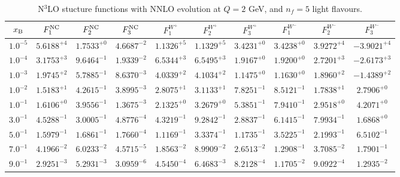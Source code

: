 \begin{table}[h]
\begin{adjustbox}{width=\textwidth}
\begin{tabular}{|c||c|c|c|c|c|c|c|c|c|}
\hline
$x_{\rm B}$ & $F_1^{\rm NC}$ & $F_2^{\rm NC}$ & $F_3^{\rm NC}$ & $F_1^{W^+}$ & $F_2^{W^+}$ & $F_3^{W^+}$ & $F_1^{W^-}$ & $F_2^{W^-}$ & $F_3^{W^-}$ \\
\hline
$ 1.0^{-5}$ & $ 5.6188^{+4}$ & $ 1.7533^{+0}$ & $ 4.6687^{-2}$ & $ 1.1326^{+5}$ & $ 1.1329^{+5}$ & $ 3.4231^{+0}$ & $ 3.4238^{+0}$ & $ 3.9272^{+4}$ & $-3.9021^{+4}$ \\
$ 1.0^{-4}$ & $ 3.1753^{+3}$ & $ 9.6464^{-1}$ & $ 1.9339^{-2}$ & $ 6.5344^{+3}$ & $ 6.5495^{+3}$ & $ 1.9167^{+0}$ & $ 1.9200^{+0}$ & $ 2.7201^{+3}$ & $-2.6173^{+3}$ \\
$ 1.0^{-3}$ & $ 1.9745^{+2}$ & $ 5.7885^{-1}$ & $ 8.6370^{-3}$ & $ 4.0339^{+2}$ & $ 4.1034^{+2}$ & $ 1.1475^{+0}$ & $ 1.1630^{+0}$ & $ 1.8960^{+2}$ & $-1.4389^{+2}$ \\
$ 1.0^{-2}$ & $ 1.5183^{+1}$ & $ 4.2615^{-1}$ & $ 3.8995^{-3}$ & $ 2.8075^{+1}$ & $ 3.1133^{+1}$ & $ 7.8251^{-1}$ & $ 8.5121^{-1}$ & $ 1.7838^{+1}$ & $ 2.7906^{+0}$ \\
$ 1.0^{-1}$ & $ 1.6106^{+0}$ & $ 3.9556^{-1}$ & $ 1.3675^{-3}$ & $ 2.1325^{+0}$ & $ 3.2679^{+0}$ & $ 5.3851^{-1}$ & $ 7.9410^{-1}$ & $ 2.9518^{+0}$ & $ 4.2071^{+0}$ \\
$ 3.0^{-1}$ & $ 4.5288^{-1}$ & $ 3.0005^{-1}$ & $ 4.8776^{-4}$ & $ 4.3219^{-1}$ & $ 9.2842^{-1}$ & $ 2.8837^{-1}$ & $ 6.1415^{-1}$ & $ 7.9934^{-1}$ & $ 1.6868^{+0}$ \\
$ 5.0^{-1}$ & $ 1.5979^{-1}$ & $ 1.6861^{-1}$ & $ 1.7660^{-4}$ & $ 1.1169^{-1}$ & $ 3.3374^{-1}$ & $ 1.1735^{-1}$ & $ 3.5225^{-1}$ & $ 2.1993^{-1}$ & $ 6.5102^{-1}$ \\
$ 7.0^{-1}$ & $ 4.1966^{-2}$ & $ 6.0233^{-2}$ & $ 4.5715^{-5}$ & $ 1.8563^{-2}$ & $ 8.9909^{-2}$ & $ 2.6513^{-2}$ & $ 1.2908^{-1}$ & $ 3.7085^{-2}$ & $ 1.7901^{-1}$ \\
$ 9.0^{-1}$ & $ 2.9251^{-3}$ & $ 5.2931^{-3}$ & $ 3.0959^{-6}$ & $ 4.5450^{-4}$ & $ 6.4683^{-3}$ & $ 8.2128^{-4}$ & $ 1.1705^{-2}$ & $ 9.0922^{-4}$ & $ 1.2935^{-2}$ \\
\hline
\end{tabular}
\end{adjustbox}\caption{N$^{3}$LO stucture functions with NNLO evolution at $Q = 2$ GeV, and $n_f=5$ light flavours.}
\label{tab:N3LO-Q2}
\end{table}


